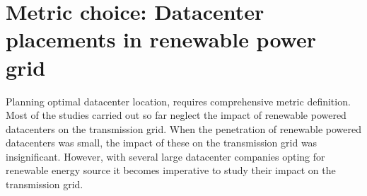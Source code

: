 \section{Metric choice: Datacenter placements in renewable power grid}
\label{sec:quantify}
Planning optimal datacenter location, requires comprehensive metric definition. Most of the studies carried out so far neglect the impact of renewable powered datacenters on the transmission grid. When the penetration of renewable powered datacenters was small, the impact of these on the transmission grid was insignificant. However, with several large datacenter companies opting for renewable energy source it becomes imperative to study their impact on the transmission grid.


